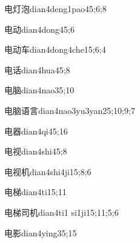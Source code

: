 \begin{verbete}{电灯泡}{dian4deng1pao4}{5;6;8}
\end{verbete}

\begin{verbete}{电动}{dian4dong4}{5;6}
\end{verbete}

\begin{verbete}{电动车}{dian4dong4che1}{5;6;4}
\end{verbete}

\begin{verbete}{电话}{dian4hua4}{5;8}
\end{verbete}

\begin{verbete}{电脑}{dian4nao3}{5;10}
\end{verbete}

\begin{verbete}{电脑语言}{dian4nao3yu3yan2}{5;10;9;7}
\end{verbete}

\begin{verbete}{电器}{dian4qi4}{5;16}
\end{verbete}

\begin{verbete}{电视}{dian4shi4}{5;8}
\end{verbete}

\begin{verbete}{电视机}{dian4shi4ji1}{5;8;6}
\end{verbete}

\begin{verbete}{电梯}{dian4ti1}{5;11}
\end{verbete}

\begin{verbete}{电梯司机}{dian4ti1 si1ji1}{5;11;5;6}
\end{verbete}

\begin{verbete}{电影}{dian4ying3}{5;15}
\end{verbete}

